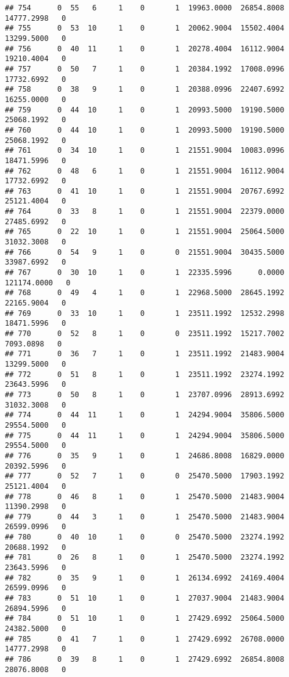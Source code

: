 \documentclass[
]{article}
\begin{document}
\begin{enumerate}
\begin{verbatim}
## 754      0  55   6     1    0       1  19963.0000  26854.8008  14777.2998   0
## 755      0  53  10     1    0       1  20062.9004  15502.4004  13299.5000   0
## 756      0  40  11     1    0       1  20278.4004  16112.9004  19210.4004   0
## 757      0  50   7     1    0       1  20384.1992  17008.0996  17732.6992   0
## 758      0  38   9     1    0       1  20388.0996  22407.6992  16255.0000   0
## 759      0  44  10     1    0       1  20993.5000  19190.5000  25068.1992   0
## 760      0  44  10     1    0       1  20993.5000  19190.5000  25068.1992   0
## 761      0  34  10     1    0       1  21551.9004  10083.0996  18471.5996   0
## 762      0  48   6     1    0       1  21551.9004  16112.9004  17732.6992   0
## 763      0  41  10     1    0       1  21551.9004  20767.6992  25121.4004   0
## 764      0  33   8     1    0       1  21551.9004  22379.0000  27485.6992   0
## 765      0  22  10     1    0       1  21551.9004  25064.5000  31032.3008   0
## 766      0  54   9     1    0       0  21551.9004  30435.5000  33987.6992   0
## 767      0  30  10     1    0       1  22335.5996      0.0000 121174.0000   0
## 768      0  49   4     1    0       1  22968.5000  28645.1992  22165.9004   0
## 769      0  33  10     1    0       1  23511.1992  12532.2998  18471.5996   0
## 770      0  52   8     1    0       0  23511.1992  15217.7002   7093.0898   0
## 771      0  36   7     1    0       1  23511.1992  21483.9004  13299.5000   0
## 772      0  51   8     1    0       1  23511.1992  23274.1992  23643.5996   0
## 773      0  50   8     1    0       1  23707.0996  28913.6992  31032.3008   0
## 774      0  44  11     1    0       1  24294.9004  35806.5000  29554.5000   0
## 775      0  44  11     1    0       1  24294.9004  35806.5000  29554.5000   0
## 776      0  35   9     1    0       1  24686.8008  16829.0000  20392.5996   0
## 777      0  52   7     1    0       0  25470.5000  17903.1992  25121.4004   0
## 778      0  46   8     1    0       1  25470.5000  21483.9004  11390.2998   0
## 779      0  44   3     1    0       1  25470.5000  21483.9004  26599.0996   0
## 780      0  40  10     1    0       0  25470.5000  23274.1992  20688.1992   0
## 781      0  26   8     1    0       1  25470.5000  23274.1992  23643.5996   0
## 782      0  35   9     1    0       1  26134.6992  24169.4004  26599.0996   0
## 783      0  51  10     1    0       1  27037.9004  21483.9004  26894.5996   0
## 784      0  51  10     1    0       1  27429.6992  25064.5000  24382.5000   0
## 785      0  41   7     1    0       1  27429.6992  26708.0000  14777.2998   0
## 786      0  39   8     1    0       1  27429.6992  26854.8008  28076.8008   0

\end{verbatim}
\end{enumerate}
\end{document}
